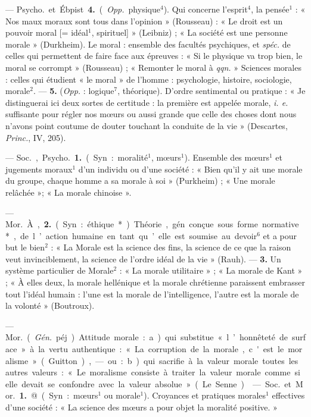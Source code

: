 \begin{itemize}[leftmargin=1cm, label=, itemsep=1pt]
— \si{Psycho.} et Ébpist. {\bf 4.} ({\it Opp.}
physique$^4$). Qui concerne l’esprit$^4$, la
pensée$^1$ : « Nos maux moraux sont
tous dans l'opinion » (Rousseau) :
« Le droit est un pouvoir moral
[= idéal$^1$, spirituel] » (Leibniz) ; « La
société est une personne morale »
(Durkheim). Le moral : ensemble
des facultés psychiques, et {\it spéc.} de
celles qui permettent de faire face
aux épreuves : « Si le physique va
trop bien, le moral se corrompt »
(Rousseau) ; « Remonter le moral à
{\it qqn.} » Sciences morales : celles qui
étudient « le moral » de l’homme :
psychologie, histoire, sociologie,
morale$^2$. — {\bf 5.} ({\it Opp.} : logique$^7$, théorique). D'ordre sentimental ou pratique : « Je distinguerai ici deux
sortes de certitude : la première est
appelée morale, {\it i. e.} suffisante pour
régler nos mœurs ou aussi grande
que celle des choses dont nous
n'avons point coutume de douter
touchant la conduite de la vie »
(Descartes, {\it Princ.}, IV, 205).

 — \si{Soc.}, \si{Psycho.} {\bf 1.} (Syn. :
moralité$^1$, mœurs$^1$). Ensemble des
mœurs$^1$ et jugements moraux$^1$ d’un
individu ou d’une société : « Bien
qu’il y ait une morale du groupe,
chaque homme a sa morale à soi »
(Purkheim) ; « Une morale relâchée »; 
« La morale chinoise ».

— \si{Mor.} À, {\bf 2.} (Syn. : éthique*).
Théorie, gén. conçue sous forme
normative*, de l’action humaine en
tant qu’elle est soumise au devoir$^6$
et a pour but le bien$^2$ : « La Morale
est la science des fins, la science de
ce que la raison veut invinciblement,
la science de l’ordre idéal de la vie »
(Rauh). — {\bf 3.} Un système particulier de Morale$^2$ : « La morale utilitaire » ; « La morale de Kant » ; « À
elles deux, la morale hellénique et la
morale chrétienne paraissent embrasser tout l'idéal humain : l’une
est la morale de l'intelligence, l’autre
est la morale de la volonté » (Boutroux).

 — \si{Mor.} ({\it Gén.} péj.) Attitude morale : a) qui substitue « l’honnêteté de surface » à la vertu authentique : « La corruption de la morale,
c'est le moralisme » (Guitton), —
ou : b) qui sacrifie à la valeur morale
toutes les autres valeurs : « Le moralisme consiste à traiter la valeur
morale comme si elle devait se confondre avec la valeur absolue » (Le
Senne).

 — \si{Soc.} et \si{Mor.} {\bf 1.} @. (Syn. :
mœurs$^1$ ou morale$^1$). Croyances et
pratiques morales$^1$ effectives d’une
société : « La science des mœurs a
pour objet la moralité positive. »


\end{itemize}
